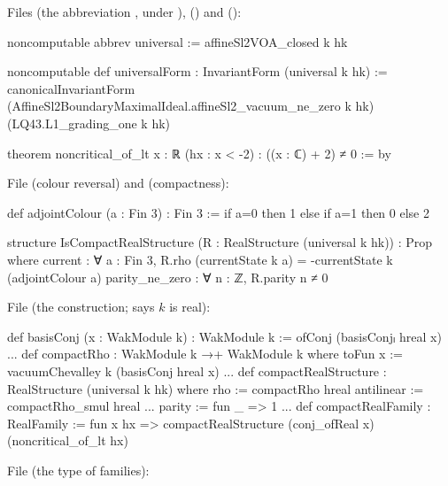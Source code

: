 {\raggedright\noindent Files  (the abbreviation
, under ),
 () and
 ():\par}
\begin{leancode}
noncomputable abbrev universal := affineSl2VOA_closed k hk

noncomputable def universalForm : InvariantForm (universal k hk) :=
  canonicalInvariantForm (AffineSl2BoundaryMaximalIdeal.affineSl2_vacuum_ne_zero k hk)
    (LQ43.L1_grading_one k hk)

theorem noncritical_of_lt {x : ℝ} (hx : x < -2) : ((x : ℂ) + 2) ≠ 0 := by
\end{leancode}
{\raggedright\noindent File  (colour reversal) and
 (compactness):\par}
\begin{leancode}
def adjointColour (a : Fin 3) : Fin 3 := if a=0 then 1 else if a=1 then 0 else 2

structure IsCompactRealStructure (R : RealStructure (universal k hk)) : Prop where
  current : ∀ a : Fin 3, R.rho (currentState k a) = -currentState k (adjointColour a)
  parity_ne_zero : ∀ n : ℤ, R.parity n ≠ 0
\end{leancode}
{\raggedright\noindent File 
(the construction;  says $k$ is real):\par}
\begin{leancode}
def basisConj (x : WakModule k) : WakModule k := ofConj (basisConjₗ hreal x)
...
def compactRho : WakModule k →+ WakModule k where
  toFun x := vacuumChevalley k (basisConj hreal x)
...
def compactRealStructure : RealStructure (universal k hk) where
  rho := compactRho hreal
  antilinear := compactRho_smul hreal
...
  parity := fun _ => 1
...
def compactRealFamily : RealFamily := fun x hx =>
  compactRealStructure (conj_ofReal x) (noncritical_of_lt hx)
\end{leancode}
{\raggedright\noindent File 
(the type of families):\par}
